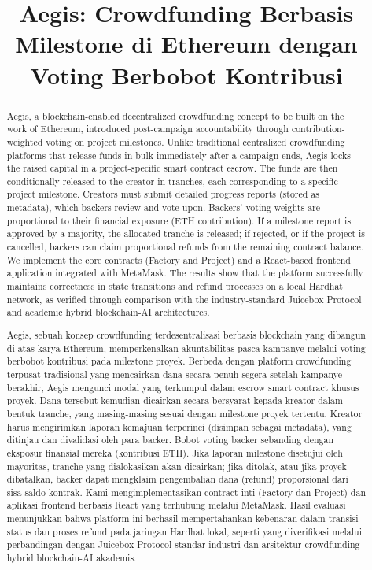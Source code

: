 \documentclass[conference]{IEEEtran}
\title{Aegis: Crowdfunding Berbasis Milestone di Ethereum dengan Voting Berbobot Kontribusi}
\author{\IEEEauthorblockN{Rifqi Ramadhan, George Wiliam Thomas Gonata, Samuel Tanaka Sibarani, dan Riri Fitri Sari}
\IEEEauthorblockA{Departemen Teknik Elektro, Fakultas Teknik, Universitas Indonesia\\
Email: {\tiny \texttt{rifqi.ramadhan22@ui.ac.id}, \texttt{george.william@ui.ac.id},}\\
{\tiny \texttt{samuel.tanaka@ui.ac.id}, \texttt{riri@ui.ac.id}}}}
\begin{document}
\maketitle

\begin{abstract}
Aegis, a blockchain-enabled decentralized crowdfunding concept to be built on the work of Ethereum, introduced post-campaign accountability through contribution-weighted voting on project milestones. Unlike traditional centralized crowdfunding platforms that release funds in bulk immediately after a campaign ends, Aegis locks the raised capital in a project-specific smart contract escrow. The funds are then conditionally released to the creator in tranches, each corresponding to a specific project milestone. Creators must submit detailed progress reports (stored as metadata), which backers review and vote upon. Backers' voting weights are proportional to their financial exposure (ETH contribution). If a milestone report is approved by a majority, the allocated tranche is released; if rejected, or if the project is cancelled, backers can claim proportional refunds from the remaining contract balance. We implement the core contracts (Factory and Project) and a React-based frontend application integrated with MetaMask. The results show that the platform successfully maintains correctness in state transitions and refund processes on a local Hardhat network, as verified through comparison with the industry-standard Juicebox Protocol and academic hybrid blockchain-AI architectures.
\end{abstract}
\renewcommand{\abstractname}{Abstrak}
\begin{abstract}
Aegis, sebuah konsep crowdfunding terdesentralisasi berbasis blockchain yang dibangun di atas karya Ethereum, memperkenalkan akuntabilitas pasca-kampanye melalui voting berbobot kontribusi pada milestone proyek. Berbeda dengan platform crowdfunding terpusat tradisional yang mencairkan dana secara penuh segera setelah kampanye berakhir, Aegis mengunci modal yang terkumpul dalam escrow smart contract khusus proyek. Dana tersebut kemudian dicairkan secara bersyarat kepada kreator dalam bentuk tranche, yang masing-masing sesuai dengan milestone proyek tertentu. Kreator harus mengirimkan laporan kemajuan terperinci (disimpan sebagai metadata), yang ditinjau dan divalidasi oleh para backer. Bobot voting backer sebanding dengan eksposur finansial mereka (kontribusi ETH). Jika laporan milestone disetujui oleh mayoritas, tranche yang dialokasikan akan dicairkan; jika ditolak, atau jika proyek dibatalkan, backer dapat mengklaim pengembalian dana (refund) proporsional dari sisa saldo kontrak. Kami mengimplementasikan contract inti (Factory dan Project) dan aplikasi frontend berbasis React yang terhubung melalui MetaMask. Hasil evaluasi menunjukkan bahwa platform ini berhasil mempertahankan kebenaran dalam transisi status dan proses refund pada jaringan Hardhat lokal, seperti yang diverifikasi melalui perbandingan dengan Juicebox Protocol standar industri dan arsitektur crowdfunding hybrid blockchain-AI akademis.
\end{abstract}
\end{document}
